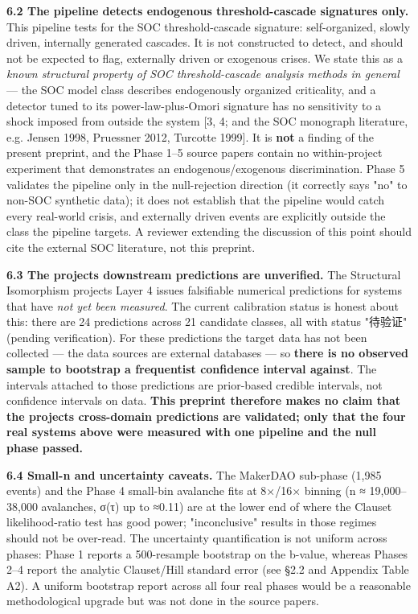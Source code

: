 \documentclass[
  11pt]{article}
\begin{document}
\textbf{6.2 The pipeline detects endogenous threshold-cascade signatures
only.} This pipeline tests for the SOC threshold-cascade signature:
self-organized, slowly driven, internally generated cascades. It is not
constructed to detect, and should not be expected to flag, externally
driven or exogenous crises. We state this as a \emph{known structural
property of SOC threshold-cascade analysis methods in general} --- the
SOC model class describes endogenously organized criticality, and a
detector tuned to its power-law-plus-Omori signature has no sensitivity
to a shock imposed from outside the system {[}3, 4; and the SOC
monograph literature, e.g. Jensen 1998, Pruessner 2012, Turcotte
1999{]}. It is \textbf{not} a finding of the present preprint, and the
Phase 1--5 source papers contain no within-project experiment that
demonstrates an endogenous/exogenous discrimination. Phase 5 validates
the pipeline only in the null-rejection direction (it correctly says
"no" to non-SOC synthetic data); it does not establish that the pipeline
would catch every real-world crisis, and externally driven events are
explicitly outside the class the pipeline targets. A reviewer extending
the discussion of this point should cite the external SOC literature,
not this preprint.

\textbf{6.3 The project\textquotesingle s downstream predictions are
unverified.} The Structural Isomorphism project\textquotesingle s Layer
4 issues falsifiable numerical predictions for systems that have
\emph{not yet been measured}. The current calibration status is honest
about this: there are 24 predictions across 21 candidate classes, all
with status "待验证" (pending verification). For these predictions the
target data has not been collected --- the data sources are external
databases --- so \textbf{there is no observed sample to bootstrap a
frequentist confidence interval against}. The intervals attached to
those predictions are prior-based credible intervals, not confidence
intervals on data. \textbf{This preprint therefore makes no claim that
the project\textquotesingle s cross-domain predictions are validated;
only that the four real systems above were measured with one pipeline
and the null phase passed.}

\textbf{6.4 Small-n and uncertainty caveats.} The MakerDAO sub-phase
(1,985 events) and the Phase 4 small-bin avalanche fits at 8×/16×
binning (n ≈ 19,000--38,000 avalanches, σ(τ) up to ≈0.11) are at the
lower end of where the Clauset likelihood-ratio test has good power;
"inconclusive" results in those regimes should not be over-read. The
uncertainty quantification is not uniform across phases: Phase 1 reports
a 500-resample bootstrap on the b-value, whereas Phases 2--4 report the
analytic Clauset/Hill standard error (see §2.2 and Appendix Table A2). A
uniform bootstrap report across all four real phases would be a
reasonable methodological upgrade but was not done in the source papers.
\end{document}
